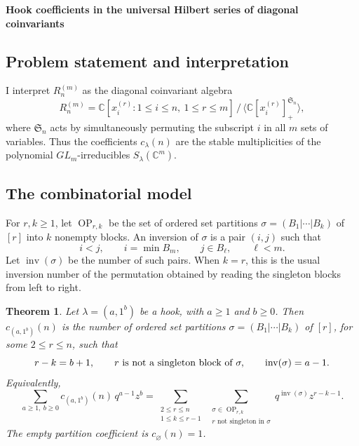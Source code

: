 \documentclass[12pt]{article}
\newtheorem{theorem}{Theorem}
\newcommand{\OP}{\operatorname{OP}}
\newcommand{\inv}{\operatorname{inv}}
\begin{document}

\date{}


\begin{center}
{\bf Hook coefficients in the universal Hilbert series of diagonal coinvariants}
\end{center}

\subsection*{Problem statement and interpretation}

I interpret \(R_n^{(m)}\) as the diagonal coinvariant algebra
\[
 R_n^{(m)}=\mathbb C[x_i^{(r)}:1\le i\le n,\ 1\le r\le m]\,
/\,\langle \mathbb C[x_i^{(r)}]^{\mathfrak S_n}_{+}\rangle,
\]
where \(\mathfrak S_n\) acts by simultaneously permuting the subscript \(i\) in all
\(m\) sets of variables.  Thus the coefficients \(c_\lambda(n)\) are the stable
multiplicities of the polynomial \(GL_m\)-irreducibles \(S_\lambda(\mathbb C^m)\).

\subsection*{The combinatorial model}

For \(r,k\ge 1\), let \(\OP_{r,k}\) be the set of ordered set partitions
\(\sigma=(B_1|\cdots|B_k)\) of \([r]\) into \(k\) nonempty blocks.  An inversion of
\(\sigma\) is a pair \((i,j)\) such that
\[
        i<j,\qquad i=\min B_m,\qquad j\in B_\ell,\qquad \ell<m .
\]
Let \(\inv(\sigma)\) be the number of such pairs.  When \(k=r\), this is the
usual inversion number of the permutation obtained by reading the singleton
blocks from left to right.

\begin{theorem}
Let \(\lambda=(a,1^b)\) be a hook, with \(a\ge 1\) and \(b\ge 0\).  Then
\(c_{(a,1^b)}(n)\) is the number of ordered set partitions
\(\sigma=(B_1|\cdots|B_k)\) of \([r]\), for some \(2\le r\le n\), such that
\[
        r-k=b+1,\qquad r\hbox{ is not a singleton block of }\sigma,\qquad
        \inv(\sigma)=a-1 .
\]
Equivalently,
\[
\sum_{a\ge1,\ b\ge0} c_{(a,1^b)}(n)\,q^{a-1}z^b
=
\sum_{\substack{2\le r\le n\\1\le k\le r-1}}
\ \sum_{\substack{\sigma\in \OP_{r,k}\\
                  r\text{ not singleton in }\sigma}}
        q^{\inv(\sigma)}z^{r-k-1}.
\]
The empty partition coefficient is \(c_{\varnothing}(n)=1\).
\end{theorem}
\end{document}
